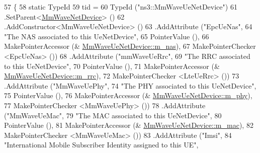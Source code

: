 \begin{DoxyCode}
57 \{
58         \textcolor{keyword}{static} TypeId
59             tid =
60             TypeId (\textcolor{stringliteral}{"ns3::MmWaveUeNetDevice"})
61             .SetParent<\hyperlink{classns3_1_1MmWaveNetDevice_a554655d89a70a36abe6cf2cb6e44f5ce}{MmWaveNetDevice}> ()
62             .AddConstructor<MmWaveUeNetDevice> ()
63                 .AddAttribute (\textcolor{stringliteral}{"EpcUeNas"},
64                                    \textcolor{stringliteral}{"The NAS associated to this UeNetDevice"},
65                                    PointerValue (),
66                                    MakePointerAccessor (&
      \hyperlink{classns3_1_1MmWaveUeNetDevice_a319384837270ac64549ce162cdc58c68}{MmWaveUeNetDevice::m\_nas}),
67                                    MakePointerChecker <EpcUeNas> ())
68                 .AddAttribute (\textcolor{stringliteral}{"mmWaveUeRrc"},
69                                    \textcolor{stringliteral}{"The RRC associated to this UeNetDevice"},
70                                    PointerValue (),
71                                    MakePointerAccessor (&
      \hyperlink{classns3_1_1MmWaveUeNetDevice_aa4abc428c965374f4106eb1e3f385bef}{MmWaveUeNetDevice::m\_rrc}),
72                                    MakePointerChecker <LteUeRrc> ())
73                 .AddAttribute (\textcolor{stringliteral}{"MmWaveUePhy"},
74                                                 \textcolor{stringliteral}{"The PHY associated to this UeNetDevice"},
75                                                 PointerValue (),
76                                                 MakePointerAccessor (&
      \hyperlink{classns3_1_1MmWaveUeNetDevice_ae85407943b5c4ae32f51969537b67157}{MmWaveUeNetDevice::m\_phy}),
77                                                 MakePointerChecker <MmWaveUePhy> ())
78                 .AddAttribute (\textcolor{stringliteral}{"MmWaveUeMac"},
79                                                 \textcolor{stringliteral}{"The MAC associated to this UeNetDevice"},
80                                                 PointerValue (),
81                                                 MakePointerAccessor (&
      \hyperlink{classns3_1_1MmWaveUeNetDevice_afd2fdd52e80c28cb09e77487d885daac}{MmWaveUeNetDevice::m\_mac}),
82                                                 MakePointerChecker <MmWaveUeMac> ())
83                 .AddAttribute (\textcolor{stringliteral}{"Imsi"},
84                          \textcolor{stringliteral}{"International Mobile Subscriber Identity assigned to this UE"},

\end{DoxyCode}
